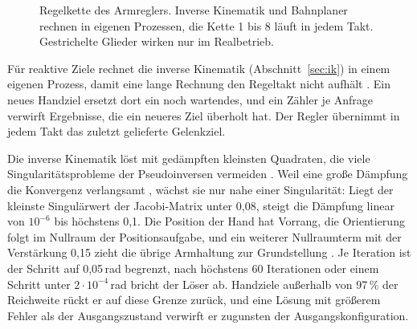 \begin{figure}[htbp]
  \centering
  
  \caption[Regelkette des Armreglers]{Regelkette des Armreglers. Inverse Kinematik und Bahnplaner rechnen in eigenen Prozessen, die Kette 1 bis 8 läuft in jedem Takt. Gestrichelte Glieder wirken nur im Realbetrieb.}
  \label{fig:regelkette}
\end{figure}

Für reaktive Ziele rechnet die inverse Kinematik (Abschnitt~\ref{sec:ik}) in einem eigenen Prozess, damit eine lange Rechnung den Regeltakt nicht aufhält .
Ein neues Handziel ersetzt dort ein noch wartendes, und ein Zähler je Anfrage verwirft Ergebnisse, die ein neueres Ziel überholt hat.
Der Regler übernimmt in jedem Takt das zuletzt gelieferte Gelenkziel.

Die inverse Kinematik löst mit gedämpften kleinsten Quadraten, die viele Singularitätsprobleme der Pseudoinversen vermeiden \cite{Aristidou2009}.
Weil eine große Dämpfung die Konvergenz verlangsamt \cite{Aristidou2009}, wächst sie nur nahe einer Singularität: Liegt der kleinste Singulärwert der Jacobi-Matrix unter 0,08, steigt die Dämpfung linear von $10^{-6}$ bis höchstens 0,1.
Die Position der Hand hat Vorrang, die Orientierung folgt im Nullraum der Positionsaufgabe, und ein weiterer Nullraumterm mit der Verstärkung 0,15 zieht die übrige Armhaltung zur Grundstellung \cite{Aristidou2009}.
Je Iteration ist der Schritt auf 0,05\,rad begrenzt, nach höchstens 60 Iterationen oder einem Schritt unter $2\cdot10^{-4}$\,rad bricht der Löser ab.
Handziele außerhalb von 97\,\% der Reichweite rückt er auf diese Grenze zurück, und eine Lösung mit größerem Fehler als der Ausgangszustand verwirft er zugunsten der Ausgangskonfiguration.

